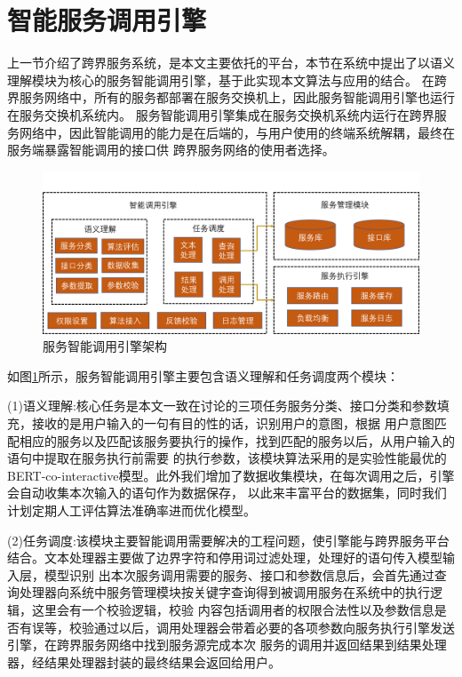   
  
  
\section{智能服务调用引擎}
上一节介绍了跨界服务系统，是本文主要依托的平台，本节在系统中提出了以语义理解模块为核心的服务智能调用引擎，基于此实现本文算法与应用的结合。
在跨界服务网络中，所有的服务都部署在服务交换机上，因此服务智能调用引擎也运行在服务交换机系统内。
服务智能调用引擎集成在服务交换机系统内运行在跨界服务网络中，因此智能调用的能力是在后端的，与用户使用的终端系统解耦，最终在服务端暴露智能调用的接口供
跨界服务网络的使用者选择。

\begin{figure}[htbp]
  \centering
  \includegraphics[width=15cm]{./images/yinqing.png}
  \caption{服务智能调用引擎架构}
  \label{fig:yinqing}
\end{figure}

如图\ref{fig:yinqing}所示，服务智能调用引擎主要包含语义理解和任务调度两个模块：

(1)语义理解:核心任务是本文一致在讨论的三项任务服务分类、接口分类和参数填充，接收的是用户输入的一句有目的性的话，识别用户的意图，根据
用户意图匹配相应的服务以及匹配该服务要执行的操作，找到匹配的服务以后，从用户输入的语句中提取在服务执行前需要
的执行参数，该模块算法采用的是实验性能最优的BERT-co-interactive模型。此外我们增加了数据收集模块，在每次调用之后，引擎会自动收集本次输入的语句作为数据保存，
以此来丰富平台的数据集，同时我们计划定期人工评估算法准确率进而优化模型。

(2)任务调度:该模块主要智能调用需要解决的工程问题，使引擎能与跨界服务平台结合。文本处理器主要做了边界字符和停用词过滤处理，处理好的语句传入模型输入层，模型识别
出本次服务调用需要的服务、接口和参数信息后，会首先通过查询处理器向系统中服务管理模块按关键字查询得到被调用服务在系统中的执行逻辑，这里会有一个校验逻辑，校验
内容包括调用者的权限合法性以及参数信息是否有误等，校验通过以后，调用处理器会带着必要的各项参数向服务执行引擎发送引擎，在跨界服务网络中找到服务源完成本次
服务的调用并返回结果到结果处理器，经结果处理器封装的最终结果会返回给用户。

